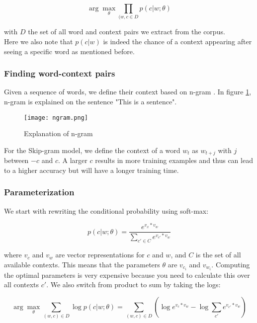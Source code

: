 \begin{equation} 
\arg \max_{\theta} \prod_{(w,c \in D} p(c|w;\theta)
\end{equation}

\noindent with $D$ the set of all word and context pairs we extract from the corpus.\\
Here we also note that $p(c|w)$ is indeed the chance of a context appearing after seeing a specific word as mentioned before.

\subsubsection{Finding word-context pairs}

Given a sequence of words, we define their context based on n-gram \cite{w2vNgram:article}. In figure \ref{fig:ngram}, n-gram is explained on the sentence "This is a sentence". 

\begin{figure}[H]
	\centering
	\texttt{[image: ngram.png]}
	\caption{Explanation of n-gram \cite{w2vNgram:online}}
	\label{fig:ngram}
\end{figure} 

For the Skip-gram model, we define the context of a word $w_t$ as $w_{t+j}$ with $j$ between $-c$ and $c$. A larger $c$ results in more training examples and thus can lead to a higher accuracy but will have a longer training time.


\subsubsection{Parameterization}

We start with rewriting the conditional probability using soft-max:

\begin{equation} 
p(c|w;\theta) = \frac{e^{v_x*v_w}}{\sum_{c' \in C}e^{v_{c'}*v_w}}
\end{equation}

\noindent where $v_c$ and $v_w$ are vector representations for $c$ and $w$, and $C$ is the set of all available contexts. This means that the parameters $\theta$ are $v_{c_i}$ and $v_{w_i}$. Computing the optimal parameters is very expensive because you need to calculate this over all contexts $c'$. We also switch from product to sum by taking the logs:

\begin{equation} 
\arg \max_{\theta} \sum_{(w,c) \in D} \log p(c|w;\theta) = \sum_{(w,c) \in D} (\log e^{v_c * v_w} - \log \sum_{c'} e^{v_{c'}*v_w})
\end{equation}

